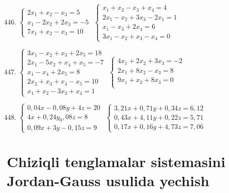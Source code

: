 \begin{enumerate}\setcounter{enumi}{445}
	\item $\begin{cases}
		2x_{1}+x_{2}-x_{3}=5\\
		x_{1}-2x_{2}+2x_{3}=-5\\
		7x_{1}+x_{2}-x_{3}=10
	\end{cases}$
\inlineitem $\begin{cases}
	x_{1}+x_{2}-x_{3}+x_{4}=4\\
	2x_{1}-x_{2}+3x_{3}-2x_{1}=1\\
	x_{1}-x_{3}+2x_{4}=6\\
	3x_{1}-x_{2}+x_{3}-x_{4}=0
\end{cases}$

\item $\begin{cases}
	3x_{1}-x_{2}+x_{3}+2x_{5}=18\\
	2x_{1}-5x_{2}+x_{4}+x_{5}=-7\\
	x_{1}-x_{4}+2x_{5}=8\\
	2x_{2}+x_{3}+x_{4}-x_{5}=10\\
	x_{1}+x_{2}-3x_{3}+x_{4}=1
\end{cases}$
\inlineitem $\begin{cases}
	4x_{1}+2x_{2}+3x_{3}=-2\\
	2x_{1}+8x_{2}-x_{3}=8\\
	9x_{1}+x_{2}+8x_{3}=0\\
\end{cases}$

\item $\begin{cases}
	0,04x-0,08y+4z=20\\
	4x+0,24y_0,08z=8\\
	0,09x+3y-0,15z=9
\end{cases}$
\inlineitem $\begin{cases}
	3,21x+0,71y+0,34z=6,12\\
	0,43x+4,11y+0,22z=5,71\\
	0,17x+0,16y+4,73z=7,06
\end{cases}$
\end{enumerate}

\section{Chiziqli tenglamalar sistemasini Jordan-Gauss usulida yechish}






